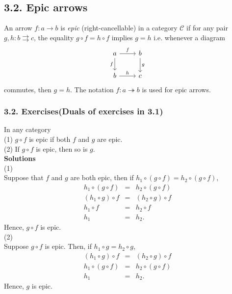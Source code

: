\documentclass{article}
\begin{document}
\subsection{3.2. Epic arrows}
\label{sec:org663d4e1}
An arrow \(f: a \rightarrow b\) is \emph{epic} (right-cancellable) in a category \(\mathcal{C}\) if for any pair \(g,h:b \rightrightarrows c\), the equality \(g \circ f = h \circ f\) implies \(g=h\) i.e. whenever a diagram
\[ \begin{tikzcd}
a \arrow{r}{f} \arrow[swap]{d}{f} & b \arrow{d}{g} \\%
b \arrow{r}{h}& c
\end{tikzcd}
\]
commutes, then \(g=h\). The notation \(f:a \twoheadrightarrow b\) is used for epic arrows.

\subsubsection{3.2. Exercises(Duals of exercises in 3.1)}
\label{sec:org359564e}
In any category\\
(1) \(g \circ f\) is epic if both \(f\) and \(g\) are epic.\\
(2) If \(g \circ f\) is epic, then so is \(g\).\\
\textbf{Solutions} \\
(1) \\
Suppose that \(f\) and \(g\) are both epic, then if \(h_{1} \circ (g \circ f) = h_{2} \circ (g \circ f)\),
\begin{eqnarray*}
h_{1} \circ (g \circ f) &=& h_{2} \circ (g \circ f)\\
(h_{1} \circ g) \circ f &=& (h_{2} \circ g) \circ f\\
h_{1} \circ f &=& h_{2} \circ f\\
h_{1} &=& h_{2}.
\end{eqnarray*}
Hence, $g \circ f$ is epic.\\
(2)\\
Suppose \(g \circ f\) is epic. Then, if \(h_{1} \circ g = h_{2} \circ g\),
\begin{eqnarray*}
(h_{1} \circ g) \circ f &=& (h_{2} \circ g) \circ f\\
h_{1} \circ (g \circ f) &=& h_{2} \circ (g \circ f)\\
h_{1} &=& h_{2}.
\end{eqnarray*}
Hence, \(g\) is epic.
\end{document}
